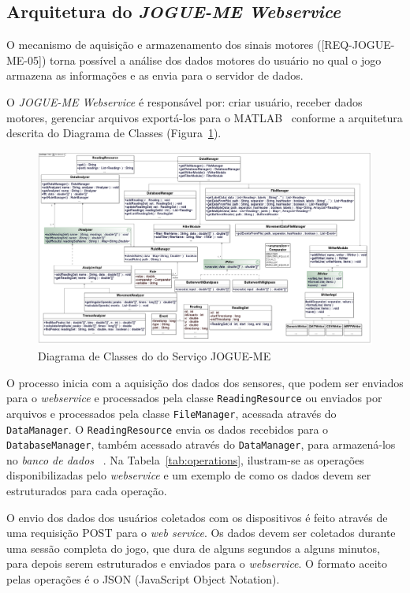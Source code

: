 \subsection{Arquitetura do \textit{JOGUE-ME Webservice}}
O mecanismo de aquisição e armazenamento dos sinais motores ([REQ-JOGUE-ME-05]) torna possível a análise dos dados motores do usuário no qual o jogo armazena as informações e as envia para o servidor de dados. 

O \textit{JOGUE-ME Webservice} é responsável por: criar usuário, receber dados motores, gerenciar arquivos exportá-los para o MATLAB~\cite{matlab2011} conforme a arquitetura descrita do Diagrama de Classes (Figura~\ref{fig:classd}).

\begin{figure}[!h]
     \centering
     \includegraphics[width=1\textwidth]{./img/class_diagram.png}
     \caption[Diagrama de Classes do Serviço JOGUE-ME]{Diagrama de Classes do do Serviço JOGUE-ME}
     \label{fig:classd}
\end{figure}

O processo inicia com a aquisição dos dados dos sensores, que podem ser enviados para o \emph{webservice} e processados pela classe \texttt{ReadingResource} ou enviados por arquivos e processados pela classe \texttt{FileManager}, acessada através do \texttt{DataManager}. O \texttt{ReadingResource} envia os dados recebidos para o \texttt{DatabaseManager}, também acessado através do \texttt{DataManager}, para armazená-los no \emph{banco de dados} ~\cite{antonio2013}. Na Tabela~\ref{tab:operations}, ilustram-se as operações disponibilizadas pelo \textit{webservice} e um exemplo de como os dados devem ser estruturados para cada operação.

O envio dos dados dos usuários coletados com os dispositivos é feito através de uma requisição POST para o \textit{web service}. Os dados devem ser coletados durante uma sessão completa do jogo, que dura de alguns segundos a alguns minutos, para depois serem estruturados e enviados para o \textit{webservice}. O formato aceito pelas operações é o JSON (JavaScript Object Notation). 


